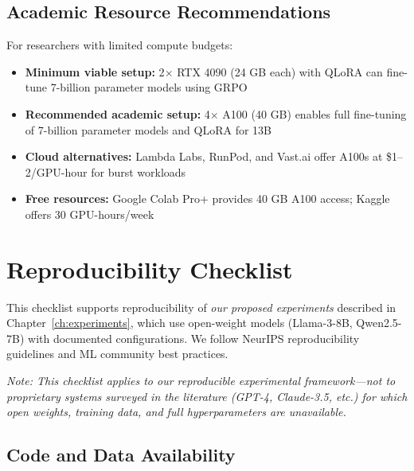 \documentclass[12pt,a4paper]{report}
\theoremstyle{definition}
\begin{document}
\section*{Academic Resource Recommendations}

For researchers with limited compute budgets:
\begin{itemize}
    \item \textbf{Minimum viable setup:} 2$\times$ RTX 4090 (24 GB each) with QLoRA can fine-tune 7-billion parameter models using GRPO
    \item \textbf{Recommended academic setup:} 4$\times$ A100 (40 GB) enables full fine-tuning of 7-billion parameter models and QLoRA for 13B
    \item \textbf{Cloud alternatives:} Lambda Labs, RunPod, and Vast.ai offer A100s at \$1--2/GPU-hour for burst workloads
    \item \textbf{Free resources:} Google Colab Pro+ provides 40 GB A100 access; Kaggle offers 30 GPU-hours/week
\end{itemize}



\chapter{Reproducibility Checklist}
\label{app:reproducibility}

This checklist supports reproducibility of \textit{our proposed experiments} described in Chapter~\ref{ch:experiments}, which use open-weight models (Llama-3-8B, Qwen2.5-7B) with documented configurations. We follow NeurIPS reproducibility guidelines and ML community best practices.

\textit{Note: This checklist applies to our reproducible experimental framework---not to proprietary systems surveyed in the literature (GPT-4, Claude-3.5, etc.) for which open weights, training data, and full hyperparameters are unavailable.}

\section*{Code and Data Availability}
\end{document}
